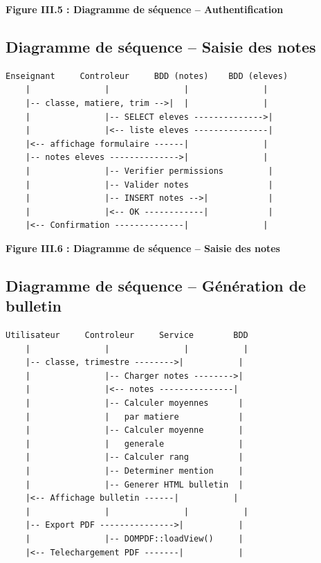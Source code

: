 \documentclass[12pt,a4paper,twoside]{report}
\begin{document}
\begin{center}
\textbf{Figure III.5 : Diagramme de séquence -- Authentification}
\end{center}

\subsection{Diagramme de séquence -- Saisie des notes}

\begin{verbatim}
Enseignant     Controleur     BDD (notes)    BDD (eleves)
    |               |               |               |
    |-- classe, matiere, trim -->|  |               |
    |               |-- SELECT eleves -------------->|
    |               |<-- liste eleves ---------------|
    |<-- affichage formulaire ------|               |
    |-- notes eleves -------------->|               |
    |               |-- Verifier permissions         |
    |               |-- Valider notes                |
    |               |-- INSERT notes -->|            |
    |               |<-- OK ------------|            |
    |<-- Confirmation --------------|               |
\end{verbatim}

\begin{center}
\textbf{Figure III.6 : Diagramme de séquence -- Saisie des notes}
\end{center}

\subsection{Diagramme de séquence -- Génération de bulletin}

\begin{verbatim}
Utilisateur     Controleur     Service        BDD
    |               |               |           |
    |-- classe, trimestre -------->|           |
    |               |-- Charger notes -------->|
    |               |<-- notes ---------------|
    |               |-- Calculer moyennes      |
    |               |   par matiere            |
    |               |-- Calculer moyenne       |
    |               |   generale               |
    |               |-- Calculer rang          |
    |               |-- Determiner mention     |
    |               |-- Generer HTML bulletin  |
    |<-- Affichage bulletin ------|           |
    |               |               |           |
    |-- Export PDF --------------->|           |
    |               |-- DOMPDF::loadView()     |
    |<-- Telechargement PDF -------|           |
\end{verbatim}
\end{document}
